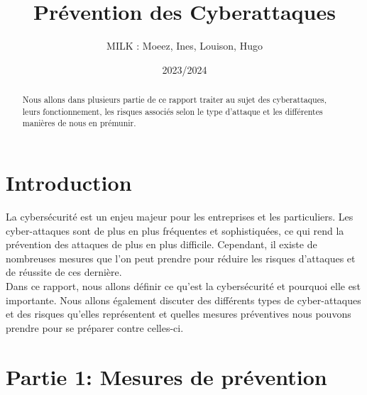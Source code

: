 \documentclass[a4paper,11pt]{article}
\begin{document}
\title{\textbf{\huge{Prévention des Cyberattaques}}}
\author{MILK : Moeez, Ines, Louison, Hugo}
\date{2023/2024}
\maketitle

\def\contentsname{Sommaire}
\tableofcontents

\begin{abstract}
  Nous allons dans plusieurs partie de ce rapport traiter au sujet des cyberattaques, leurs fonctionnement, les risques associés selon le type d'attaque et les dif{\null}férentes manières de nous en prémunir.
\end{abstract}


\section{Introduction}

La cybersécurité est un enjeu majeur pour les entreprises et les particuliers. 
Les cyber-attaques sont de plus en plus fréquentes et sophistiquées, ce qui rend la prévention des attaques de plus en plus dif{\null}f{\null}icile. 
Cependant, il existe de nombreuses mesures que l'on peut prendre pour réduire les risques d'attaques et de réussite de ces dernière.
\\Dans ce rapport, nous allons déf{\null}inir ce qu'est la cybersécurité et pourquoi elle est importante. 
Nous allons également discuter des dif{\null}férents types de cyber-attaques et des risques qu'elles représentent et quelles mesures préventives nous pouvons prendre pour se préparer contre celles-ci.


\section{Partie 1: Mesures de prévention}
\end{document}

